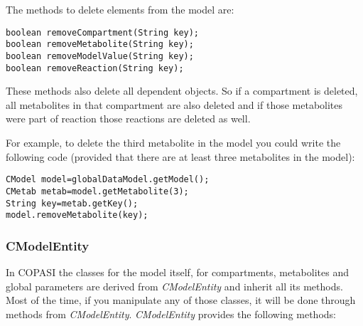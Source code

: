 \documentclass[a4,10pt]{article}
\begin{document}
The methods to delete elements from the model are:

\begin{lstlisting}
boolean removeCompartment(String key);
boolean removeMetabolite(String key);
boolean removeModelValue(String key);
boolean removeReaction(String key);
\end{lstlisting}

These methods also delete all dependent objects. So if a compartment is deleted, all metabolites in that compartment are also deleted and if those metabolites were part of reaction those reactions are deleted as well.

For example, to delete the third metabolite in the model you could write the following code (provided that there are at least three metabolites in the model):

\begin{lstlisting}
CModel model=globalDataModel.getModel();
CMetab metab=model.getMetabolite(3);
String key=metab.getKey();
model.removeMetabolite(key);
\end{lstlisting}

\subsubsection{CModelEntity}
In COPASI the classes for the model itself, for compartments, metabolites and global parameters are derived from \textit{CModelEntity} and inherit all its methods.
Most of the time, if you manipulate any of those classes, it will be done through methods from \textit{CModelEntity}.
\textit{CModelEntity} provides the following methods:
\end{document}
